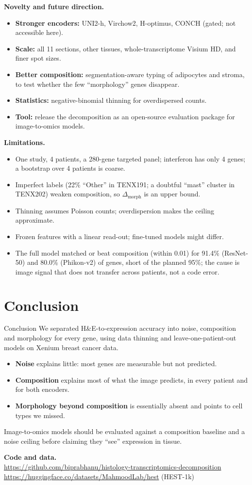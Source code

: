 \documentclass[11pt,a4paper]{article}
\newcommand{\dm}{\Delta_{\mathrm{morph}}}
\begin{document}
\textbf{Novelty and future direction.}
\begin{itemize}
  \item \textbf{Stronger encoders:} UNI2-h, Virchow2, H-optimus, CONCH (gated; not accessible here).
  \item \textbf{Scale:} all 11 sections, other tissues, whole-transcriptome Visium HD, and finer spot sizes.
  \item \textbf{Better composition:} segmentation-aware typing of adipocytes and stroma, to test whether the few ``morphology'' genes disappear.
  \item \textbf{Statistics:} negative-binomial thinning for overdispersed counts.
  \item \textbf{Tool:} release the decomposition as an open-source evaluation package for image-to-omics models.
\end{itemize}

\textbf{Limitations.}
\begin{itemize}
  \item One study, 4 patients, a 280-gene targeted panel; interferon has only 4 genes; a bootstrap over 4 patients is coarse.
  \item Imperfect labels (22\% ``Other'' in TENX191; a doubtful ``mast'' cluster in TENX202) weaken composition, so $\dm$ is an upper bound.
  \item Thinning assumes Poisson counts; overdispersion makes the ceiling approximate.
  \item Frozen features with a linear read-out; fine-tuned models might differ.
  \item The full model matched or beat composition (within 0.01) for 91.4\% (ResNet-50) and 80.0\% (Phikon-v2) of genes, short of the planned 95\%; the cause is image signal that does not transfer across patients, not a code error.
\end{itemize}

\section{Conclusion}

\begin{keybox}{Conclusion}
We separated H\&E-to-expression accuracy into noise, composition and morphology for every gene, using data thinning and leave-one-patient-out models on Xenium breast cancer data.
\begin{itemize}[leftmargin=*]
  \item \textbf{Noise} explains little: most genes are measurable but not predicted.
  \item \textbf{Composition} explains most of what the image predicts, in every patient and for both encoders.
  \item \textbf{Morphology beyond composition} is essentially absent and points to cell types we missed.
\end{itemize}
Image-to-omics models should be evaluated against a composition baseline and a noise ceiling before claiming they ``see'' expression in tissue.
\end{keybox}

\medskip
\noindent\textbf{Code and data.}\\
\url{https://github.com/biprabhanu/histology-transcriptomics-decomposition}\\
\url{https://huggingface.co/datasets/MahmoodLab/hest} (HEST-1k)



\end{document}
